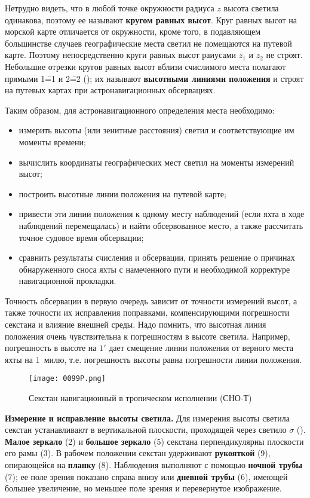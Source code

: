 Нетрудно видеть, что в любой точке окружности радиуса $z$ высота светила
одинакова, поэтому ее называют \textbf{кругом равных высот}. Круг равных высот
на морской карте отличается от окружности, кроме того, в подавляющем
большинстве случаев географические места светил не помещаются на
путевой карте. Поэтому непосредственно круги равных высот раиусами $z_1$
и $z_2$ не строят. Небольшие отрезки кругов равных высот вблизи
счислимого места полагают прямыми 1\==1 и 2\==2 (); их называют
\textbf{высотными линиями положения} и строят на путевых картах при
астронавигационных обсервациях.

Таким образом, для астронавигационного определения места необходимо:

\begin{itemize}
\item измерить высоты (или зенитные расстояния) светил и
  соответствующие им моменты времени;
\item вычислить координаты географических мест светил на моменты
  измерений высот;
\item построить высотные линии положения на путевой карте;
\item привести эти линии положения к одному месту наблюдений (если
  яхта в ходе наблюдений перемещалась) и найти обсервованное место, а
  также рассчитать точное судовое время обсервации;
\item сравнить результаты счисления и обсервации, принять решение о
  причинах обнаруженного сноса яхты с намеченного пути и необходимой
  корректуре навигационной прокладки.
\end{itemize}

Точность обсервации в первую очередь зависит от точности измерений
высот, а также точности их исправления поправками, компенсирующими
погрешности секстана и влияние внешней среды. Надо помнить, что
высотная линия положения очень чувствительна к погрешностям в высоте
светила. Например, погрешность в высоте на $1'$ дает смещение линии
положения от верного места яхты на 1~милю, т.е. погрешность высоты
равна погрешности линии положения.

\begin{figure*}[!htb]
  \centering
  \texttt{[image: 0099P.png]}
  \caption{Секстан навигационный в тропическом исполнении (СНО-Т)}
  \label{fig:99}
\end{figure*}

\textbf{Измерение и исправление высоты светила.} Для измерения высоты
светила секстан устанавливают в вертикальной плоскости, проходящей
через светило $\sigma$ (). \textbf{Малое зеркало} (2) и
\textbf{большое зеркало} (5) секстана перпендикулярны плоскости его
рамы (3). В рабочем положении секстан удерживают \textbf{рукояткой}
(9), опирающейся на \textbf{планку} (8). Наблюдения выполняют с
помощью \textbf{ночной трубы} (7); ее поле зрения показано справа
внизу или \textbf{дневной трубы} (6), имеющей большее увеличение, но
меньшее поле зрения и перевернутое изображение.

